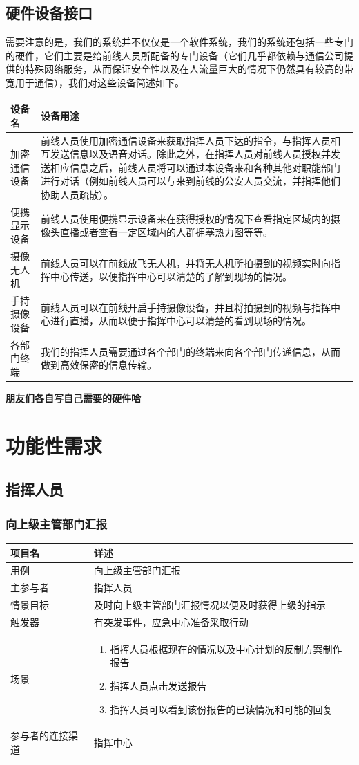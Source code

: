 \documentclass{ctexrep}
\begin{document}
\subsection{硬件设备接口}
需要注意的是，我们的系统并不仅仅是一个软件系统，我们的系统还包括一些专门的硬件，它们主要是给前线人员所配备的专门设备（它们几乎都依赖与通信公司提供的特殊网络服务，从而保证安全性以及在人流量巨大的情况下仍然具有较高的带宽用于通信），我们对这些设备简述如下。
\begin{longtable}{p{2cm}|p{10cm}}
\hline
设备名 & 设备用途 \\
\hline
\hline
加密通信设备 & 前线人员使用加密通信设备来获取指挥人员下达的指令，与指挥人员相互发送信息以及语音对话。除此之外，在指挥人员对前线人员授权并发送相应信息之后，前线人员将可以通过本设备来和各种其他对职能部门进行对话（例如前线人员可以与来到前线的公安人员交流，并指挥他们协助人员疏散）。 \\
\hline
便携显示设备 & 前线人员使用便携显示设备来在获得授权的情况下查看指定区域内的摄像头直播或者查看一定区域内的人群拥塞热力图等等。 \\
\hline
摄像无人机 & 前线人员可以在前线放飞无人机，并将无人机所拍摄到的视频实时向指挥中心传送，以便指挥中心可以清楚的了解到现场的情况。 \\
\hline
手持摄像设备 & 前线人员可以在前线开启手持摄像设备，并且将拍摄到的视频与指挥中心进行直播，从而以便于指挥中心可以清楚的看到现场的情况。 \\
\hline
各部门终端 & 我们的指挥人员需要通过各个部门的终端来向各个部门传递信息，从而做到高效保密的信息传输。\\
\hline
\end{longtable}
\textbf{朋友们各自写自己需要的硬件哈}
\section{功能性需求}
\subsection{指挥人员}
\subsubsection{向上级主管部门汇报}
\begin{longtable}{p{2cm} | p{10cm}}
\hline
项目名 & 详述 \\
\hline
\hline
用例 & 向上级主管部门汇报\\
\hline
主参与者 & 指挥人员 \\
\hline
情景目标 &  及时向上级主管部门汇报情况以便及时获得上级的指示\\
\hline
触发器 & 有突发事件，应急中心准备采取行动\\
\hline
场景 & \begin{enumerate}
	\item 指挥人员根据现在的情况以及中心计划的反制方案制作报告
	\item 指挥人员点击发送报告
	\item 指挥人员可以看到该份报告的已读情况和可能的回复
\end{enumerate} \\
\hline
参与者的连接渠道 & 指挥中心 \\
\hline
\end{longtable}
\end{document}
